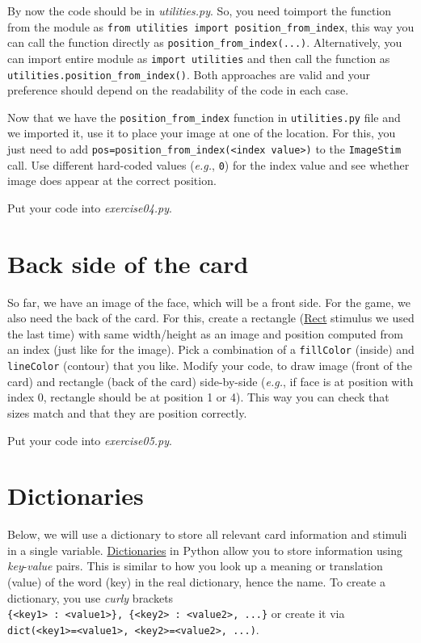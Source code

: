 \documentclass[
]{book}
\begin{document}
By now the code should be in \emph{utilities.py}. So, you need toimport the function from the module as \texttt{from\ utilities\ import\ position\_from\_index}, this way you can call the function directly as \texttt{position\_from\_index(...)}. Alternatively, you can import entire module as \texttt{import\ utilities} and then call the function as \texttt{utilities.position\_from\_index()}. Both approaches are valid and your preference should depend on the readability of the code in each case.

Now that we have the \texttt{position\_from\_index} function in \texttt{utilities.py} file and we imported it, use it to place your image at one of the location. For this, you just need to add \texttt{pos=position\_from\_index(\textless{}index\ value\textgreater{})} to the \texttt{ImageStim} call. Use different hard-coded values (\emph{e.g.}, \texttt{0}) for the index value and see whether image does appear at the correct position.

Put your code into \emph{exercise04.py}.

\hypertarget{back-side-of-the-card}{%
\section{Back side of the card}\label{back-side-of-the-card}}

So far, we have an image of the face, which will be a front side. For the game, we also need the back of the card. For this, create a rectangle (\href{https://psychopy.org/api/visual/rect.html}{Rect} stimulus we used the last time) with same width/height as an image and position computed from an index (just like for the image). Pick a combination of a \texttt{fillColor} (inside) and \texttt{lineColor} (contour) that you like. Modify your code, to draw image (front of the card) and rectangle (back of the card) side-by-side (\emph{e.g.}, if face is at position with index 0, rectangle should be at position 1 or 4). This way you can check that sizes match and that they are position correctly.

Put your code into \emph{exercise05.py}.

\hypertarget{dictionaries}{%
\section{Dictionaries}\label{dictionaries}}

Below, we will use a dictionary to store all relevant card information and stimuli in a single variable. \href{https://docs.python.org/3/library/stdtypes.html\#dict}{Dictionaries} in Python allow you to store information using \emph{key}-\emph{value} pairs. This is similar to how you look up a meaning or translation (value) of the word (key) in the real dictionary, hence the name. To create a dictionary, you use \emph{curly} brackets \texttt{\{\textless{}key1\textgreater{}\ :\ \textless{}value1\textgreater{}\},\ \{\textless{}key2\textgreater{}\ :\ \textless{}value2\textgreater{},\ ...\}} or create it via \texttt{dict(\textless{}key1\textgreater{}=\textless{}value1\textgreater{},\ \textless{}key2\textgreater{}=\textless{}value2\textgreater{},\ ...)}.
\end{document}

